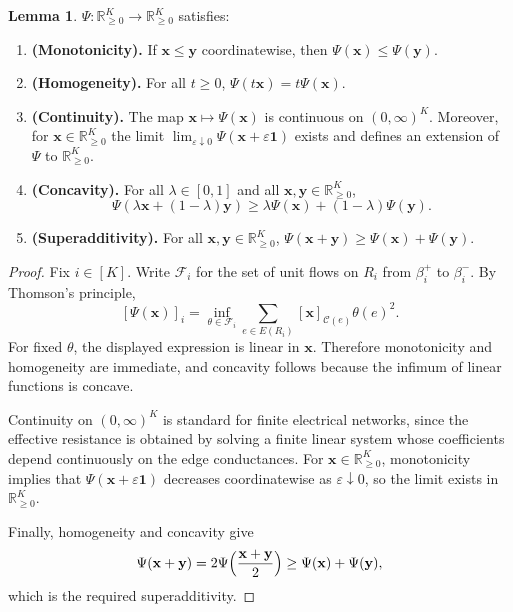 \documentclass{article}
\theoremstyle{plain}
\theoremstyle{definition}
\newtheorem{lemma}[theorem]{Lemma}
\begin{document}
\begin{lemma}\label{lem:psi-props}
$\Psi:\mathbb R_{\ge 0}^K\to \mathbb R_{\ge 0}^K$ satisfies:
\begin{enumerate}
\item \textbf{(Monotonicity).}
If $\mathbf x\le \mathbf y$ coordinatewise, then
$
\Psi(\mathbf x)\le \Psi(\mathbf y).
$

\item \textbf{(Homogeneity).}
For all $t\ge 0$,
$
\Psi(t\mathbf x)=t\Psi(\mathbf x).
$

\item \textbf{(Continuity).}
The map $\mathbf x\mapsto \Psi(\mathbf x)$ is continuous on $(0,\infty)^K$.
Moreover, for $\mathbf x\in\mathbb R_{\ge 0}^K$ the limit
$
\lim_{\varepsilon\downarrow 0}\Psi(\mathbf x+\varepsilon\mathbf 1)
$
exists and defines an extension of $\Psi$ to $\mathbb R_{\ge 0}^K$.

\item \textbf{(Concavity).}
For all $\lambda\in[0,1]$ and all $\mathbf x,\mathbf y\in\mathbb R_{\ge 0}^K$,
\[
\Psi(\lambda\mathbf x+(1-\lambda)\mathbf y)
\ge
\lambda \Psi(\mathbf x)+(1-\lambda)\Psi(\mathbf y).
\]

\item \textbf{(Superadditivity).}
For all $\mathbf x,\mathbf y\in\mathbb R_{\ge 0}^K$,
$
\Psi(\mathbf x+\mathbf y)\ge \Psi(\mathbf x)+\Psi(\mathbf y).
$
\end{enumerate}
\end{lemma}

\begin{proof}
Fix $i\in[K]$.
Write $\mathcal F_i$ for the set of unit flows on $R_i$ from $\beta_i^+$ to $\beta_i^-$.
By Thomson's principle,
\[
[\Psi(\mathbf x)]_i
=
\inf_{\theta\in \mathcal F_i}
\sum_{e\in E(R_i)} [\mathbf x]_{\mathscr C(e)}\theta(e)^2.
\]
For fixed $\theta$, the displayed expression is linear in $\mathbf x$.
Therefore monotonicity and homogeneity are immediate, and concavity follows because the infimum of linear functions is concave.

Continuity on $(0,\infty)^K$ is standard for finite electrical networks, since the effective resistance is obtained by solving a finite linear system whose coefficients depend continuously on the edge conductances.
For $\mathbf x\in\mathbb R_{\ge 0}^K$, monotonicity implies that $\Psi(\mathbf x+\varepsilon\mathbf 1)$ decreases coordinatewise as $\varepsilon\downarrow 0$, so the limit exists in $\mathbb R_{\ge 0}^K$.

Finally, homogeneity and concavity give
\[
\Psi(\mathbf x+\mathbf y)
=
2\Psi\Bigl(\frac{\mathbf x+\mathbf y}{2}\Bigr)
\ge
\Psi(\mathbf x)+\Psi(\mathbf y),
\]
which is the required superadditivity.
\end{proof}
\end{document}

